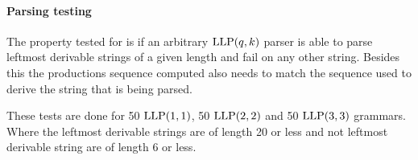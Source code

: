 \paragraph{Parsing testing}
The property tested for is if an arbitrary $\text{LLP}(q,k)$ parser is able to parse leftmost derivable strings of a given length and fail on any other string. Besides this the productions sequence computed also needs to match the sequence used to derive the string that is being parsed.

These tests are done for 50 $\text{LLP}(1,1)$, 50 $\text{LLP}(2,2)$ and 50 $\text{LLP}(3,3)$ grammars. Where the leftmost derivable strings are of length 20 or less and not leftmost derivable string are of length 6 or less.
 